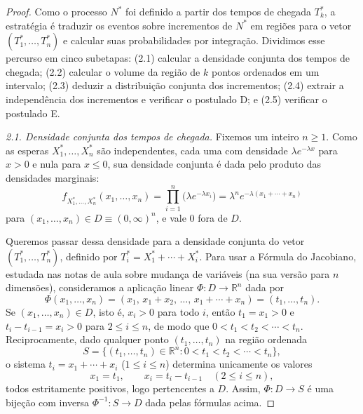 \documentclass[12pt,portuguese]{article}
\theoremstyle{definition}
\theoremstyle{plainexercise}
\theoremstyle{starredexercise}
\theoremstyle{definition}
\begin{document}
\begin{proof}
Como o processo $N^*$ foi definido a partir dos tempos de chegada $T_k^*$, a
estratégia é traduzir os eventos sobre incrementos de $N^*$ em regiões para o
vetor $(T_1^*,\ldots,T_n^*)$ e calcular suas probabilidades por integração.
Dividimos esse percurso em cinco subetapas:
(2.1) calcular a densidade conjunta dos tempos de chegada;
(2.2) calcular o volume da região de $k$ pontos ordenados em um intervalo;
(2.3) deduzir a distribuição conjunta dos incrementos;
(2.4) extrair a independência dos incrementos e verificar o postulado D; e
(2.5) verificar o postulado E.

\smallskip
\noindent\textit{2.1. Densidade conjunta dos tempos de chegada.}
Fixemos um inteiro $n\geqslant1$. Como as esperas $X_1^*,\ldots,X_n^*$ são
independentes, cada uma com densidade $\lambda e^{-\lambda x}$ para $x>0$ e
nula para $x\leqslant0$, sua densidade conjunta é dada pelo produto das
densidades marginais:
\[
  f_{X_1^*,\ldots,X_n^*}(x_1,\ldots,x_n)
  =\prod_{i=1}^{n}\bigl(\lambda e^{-\lambda x_i}\bigr)
  =\lambda^n e^{-\lambda(x_1+\cdots+x_n)}
\]
para $(x_1,\ldots,x_n)\in D\equiv(0,\infty)^n$, e vale $0$ fora de $D$.

Queremos passar dessa densidade para a densidade conjunta do vetor
$(T_1^*,\ldots,T_n^*)$, definido por $T_i^*=X_1^*+\cdots+X_i^*$. Para usar a
Fórmula do Jacobiano, estudada nas notas de aula sobre mudança de variáveis (na
sua versão para $n$ dimensões), consideramos a aplicação linear
$\Phi:D\to\mathbb{R}^n$ dada por
\[
  \Phi(x_1,\ldots,x_n)
  =(x_1,\,x_1+x_2,\,\ldots,\,x_1+\cdots+x_n)
  =(t_1,\ldots,t_n).
\]
Se $(x_1,\ldots,x_n)\in D$, isto é, $x_i>0$ para todo $i$, então $t_1=x_1>0$ e
$t_i-t_{i-1}=x_i>0$ para $2\leqslant i\leqslant n$, de modo que
$0<t_1<t_2<\cdots<t_n$. Reciprocamente, dado qualquer ponto $(t_1,\ldots,t_n)$
na região ordenada
\[
  S=\{(t_1,\ldots,t_n)\in\mathbb{R}^n : 0<t_1<t_2<\cdots<t_n\},
\]
o sistema $t_i=x_1+\cdots+x_i$ ($1\leqslant i\leqslant n$) determina
unicamente os valores
\[
  x_1=t_1,
  \qquad
  x_i=t_i-t_{i-1}\quad(2\leqslant i\leqslant n),
\]
todos estritamente positivos, logo pertencentes a $D$. Assim, $\Phi:D\to S$ é
uma bijeção com inversa $\Phi^{-1}:S\to D$ dada pelas fórmulas acima.


\end{proof}
\end{document}

